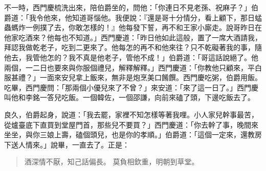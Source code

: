 不一時，西門慶梳洗出來，陪伯爵坐的，問他：「你連日不見老孫、祝麻子？」伯爵道：「我令他來，他知道哥惱他。我便說：『還是哥十分情分，看上顧下，那日蜢蟲螞炸一例撲了去，你敢怎樣的！』他每發下誓，再不和王家小廝走。說哥昨日在他家吃酒來？他每也不知道。」西門慶道：「昨日他如此這般，置了一席大酒請我，拜認我做乾老子，吃到二更來了。他每怎的再不和他來往？只不乾礙著我的事，隨他去，我管他怎的？我不真是他老子，管他不成！」伯爵道：「哥這話說絕了。他兩個，一二日也要來與你服個禮兒，解釋解釋。」西門慶道：「你教他只顧來，平白服甚禮？」一面來安兒拿上飯來，無非是炮烹美口餚饌。西門慶吃粥，伯爵用飯。吃畢，西門慶問：「那兩個小優兒來了不曾？」來安道：「來了這一日了。」西門慶叫他和李銘一答兒吃飯。一個韓佐，一個邵謙，向前來磕了頭，下邊吃飯去了。

良久，伯爵起身，說道：「我去罷，家裡不知怎樣等著我哩。小人家兒幹事最苦，從爐臺底下直買到堂屋門首，那些兒不要買？」西門慶道：「你去幹了事，晚間來坐坐，與你三娘上壽，磕個頭兒，也是你的孝順。」伯爵道：「這個一定來，還教房下送人情來。」說畢，一直去了。正是：
\begin{quote}
酒深情不厭，知己話偏長。
莫負相欽重，明朝到草堂。
\end{quote}
